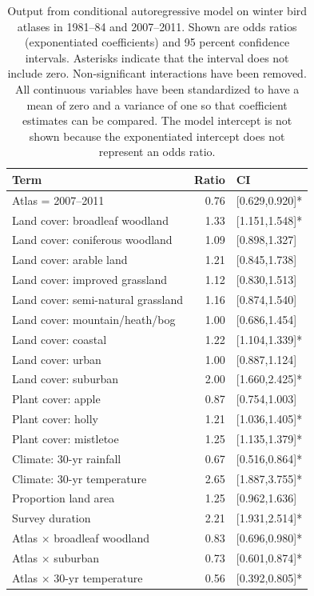 \documentclass[a4paper, twoside]{templates/ociamthesis}
\begin{document}
\begin{table}[t]

\caption{\label{tab:dist-model-table}Output from conditional autoregressive model on winter bird atlases in 1981--84 and 2007--2011. Shown are odds ratios (exponentiated coefficients) and 95 percent confidence intervals. Asterisks indicate that the interval does not include zero. Non-significant interactions have been removed. All continuous variables have been standardized to have a mean of zero and a variance of one so that coefficient estimates can be compared. The model intercept is not shown because the exponentiated intercept does not represent an odds ratio.}
\centering
\begin{tabular}{l|r|l}
\hline
Term & Ratio & CI\\
\hline
Atlas = 2007--2011 & 0.76 & [0.629,0.920]*\\
\hline
Land cover: broadleaf woodland & 1.33 & [1.151,1.548]*\\
\hline
Land cover: coniferous woodland & 1.09 & [0.898,1.327]\\
\hline
Land cover: arable land & 1.21 & [0.845,1.738]\\
\hline
Land cover: improved grassland & 1.12 & [0.830,1.513]\\
\hline
Land cover: semi-natural grassland & 1.16 & [0.874,1.540]\\
\hline
Land cover: mountain/heath/bog & 1.00 & [0.686,1.454]\\
\hline
Land cover: coastal & 1.22 & [1.104,1.339]*\\
\hline
Land cover: urban & 1.00 & [0.887,1.124]\\
\hline
Land cover: suburban & 2.00 & [1.660,2.425]*\\
\hline
Plant cover: apple & 0.87 & [0.754,1.003]\\
\hline
Plant cover: holly & 1.21 & [1.036,1.405]*\\
\hline
Plant cover: mistletoe & 1.25 & [1.135,1.379]*\\
\hline
Climate: 30-yr rainfall & 0.67 & [0.516,0.864]*\\
\hline
Climate: 30-yr temperature & 2.65 & [1.887,3.755]*\\
\hline
Proportion land area & 1.25 & [0.962,1.636]\\
\hline
Survey duration & 2.21 & [1.931,2.514]*\\
\hline
Atlas $\times$ broadleaf woodland & 0.83 & [0.696,0.980]*\\
\hline
Atlas $\times$ suburban & 0.73 & [0.601,0.874]*\\
\hline
Atlas $\times$ 30-yr temperature & 0.56 & [0.392,0.805]*\\
\hline
\end{tabular}
\end{table}
\end{document}
